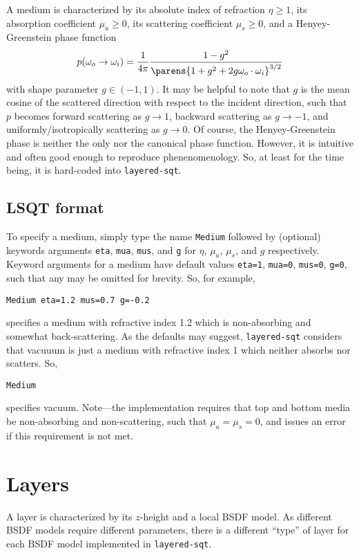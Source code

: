 \documentclass[
    twoside,
    twocolumn,
    letterpaper,
    defaultfont,
    rmheading,
    10pt]{article}
\begin{document}
A medium is characterized by its 
absolute index of refraction $\eta \ge 1$, its absorption coefficient 
$\mu_a \ge 0 $, its scattering coefficient $\mu_s \ge 0$, and a 
Henyey-Greenstein phase function
\begin{equation*}
    p(\omega_o\to\omega_i) = 
    \frac{1}{4\pi}
    \frac{1-g^2}{\parens{1+g^2+2g\omega_o\cdot\omega_i}^{3/2}}
\end{equation*}
with shape parameter $g\in(-1,1)$. It may be helpful to note 
that $g$ is the mean cosine of the scattered direction with respect to the 
incident direction, such that $p$ becomes forward scattering as $g\to1$, 
backward scattering as $g\to-1$, and uniformly/isotropically scattering 
as $g\to0$. Of course, the Henyey-Greenstein phase is neither the only 
nor the canonical phase function. However, it is intuitive and often 
good enough to reproduce phenenomenology. So, at least for the time being, 
it is hard-coded into \texttt{layered-sqt}.

\subsection{LSQT format}

To specify a medium, simply type the name \texttt{Medium} followed 
by (optional) keywords arguments \texttt{eta}, \texttt{mua}, 
\texttt{mus}, and \texttt{g} for $\eta$, $\mu_a$, $\mu_s$, and $g$
respectively. Keyword 
arguments for a medium have default values \texttt{eta=1}, \texttt{mua=0}, 
\texttt{mus=0}, \texttt{g=0}, such that any may be omitted for brevity.
So, for example,
\begin{verbatim}
Medium eta=1.2 mus=0.7 g=-0.2
\end{verbatim}
specifies a medium with refractive index 1.2 which is non-absorbing and 
somewhat back-scattering. As the defaults may suggest, \texttt{layered-sqt}
considers that vacuuum is just a medium with refractive index 1 which neither
absorbs nor scatters. So,
\begin{verbatim}
Medium
\end{verbatim}
specifies vacuum. Note---the implementation requires that top and 
bottom media be non-absorbing and non-scattering, such that $\mu_a=\mu_s=0$,
and issues an error if this requirement is not met.

\section{Layers}

A layer is characterized by its $z$-height and 
a local BSDF model. As different BSDF models require different 
parameters, there is a different ``type'' of layer for each 
BSDF model implemented in \texttt{layered-sqt}. 
\end{document}
